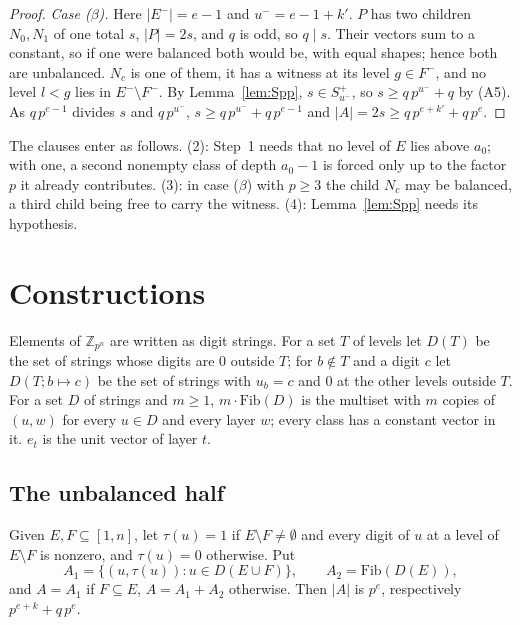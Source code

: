 \documentclass[11pt,a4paper]{amsart}
\theoremstyle{definition}
\theoremstyle{remark}
\newcommand{\Z}{\mathbb{Z}}
\newcommand{\Sp}{S^{+}}
\begin{document}
\begin{proof}
\emph{Case ($\beta$).} Here $|E^-|=e-1$ and $u^-=e-1+k'$. $P$ has two children $N_0,N_1$ of one total $s$,
$|P|=2s$, and $q$ is odd, so $q\mid s$. Their vectors sum to a constant, so if one were balanced both would
be, with equal shapes; hence both are unbalanced. $N_c$ is one of them, it has a witness at its level
$g\in F^-$, and no level $l<g$ lies in $E^-\setminus F^-$. By Lemma~\ref{lem:Spp}, $s\in\Sp_{u^-}$, so
$s\ge q\,p^{u^-}+q$ by (A5). As $q\,p^{e-1}$ divides $s$ and $q\,p^{u^-}$,
$s\ge q\,p^{u^-}+q\,p^{e-1}$ and $|A|=2s\ge q\,p^{e+k'}+q\,p^e$.
\end{proof}

The clauses enter as follows. (2): Step~1 needs that no level of $E$ lies above $a_0$; with one, a second
nonempty class of depth $a_0-1$ is forced only up to the factor $p$ it already contributes. (3): in case
($\beta$) with $p\ge3$ the child $N_c$ may be balanced, a third child being free to carry the witness. (4):
Lemma~\ref{lem:Spp} needs its hypothesis.

\section{Constructions}\label{sec:constructions}

Elements of $\Z_{p^n}$ are written as digit strings. For a set $T$ of levels let $D(T)$ be the set of
strings whose digits are $0$ outside $T$; for $b\notin T$ and a digit $c$ let $D(T;b\mapsto c)$ be the set of
strings with $u_b=c$ and $0$ at the other levels outside $T$. For a set $D$ of strings and $m\ge1$,
$m\cdot\mathrm{Fib}(D)$ is the multiset with $m$ copies of $(u,w)$ for every $u\in D$ and every layer $w$;
every class has a constant vector in it. $e_t$ is the unit vector of layer $t$.

\subsection{The unbalanced half} Given $E,F\subseteq[1,n]$, let $\tau(u)=1$ if $E\setminus F\ne\emptyset$
and every digit of $u$ at a level of $E\setminus F$ is nonzero, and $\tau(u)=0$ otherwise. Put
\[ A_1=\{(u,\tau(u)):u\in D(E\cup F)\},\qquad A_2=\mathrm{Fib}(D(E)), \]
and $A=A_1$ if $F\subseteq E$, $A=A_1+A_2$ otherwise. Then $|A|$ is $p^{e}$, respectively $p^{e+k}+q\,p^{e}$.
\end{document}
